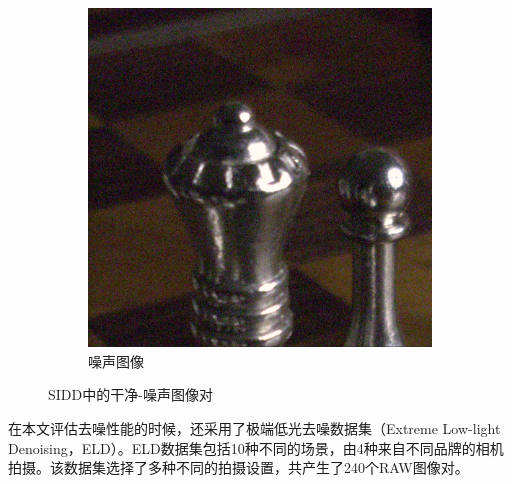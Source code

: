 \begin{figure}[htbp]
\begin{subfigure}{0.4835\linewidth}
		\includegraphics[width=\linewidth]{imgs/noisycut.png}
		\caption{噪声图像}
		\label{noisy}%
	\end{subfigure}  
	
	\caption{SIDD中的干净-噪声图像对}
\end{figure}

在本文评估去噪性能的时候，还采用了极端低光去噪数据集（Extreme Low-light Denoising，ELD）\cite{eld}。ELD数据集包括10种不同的场景，由4种来自不同品牌的相机拍摄。该数据集选择了多种不同的拍摄设置，共产生了240个RAW图像对。

